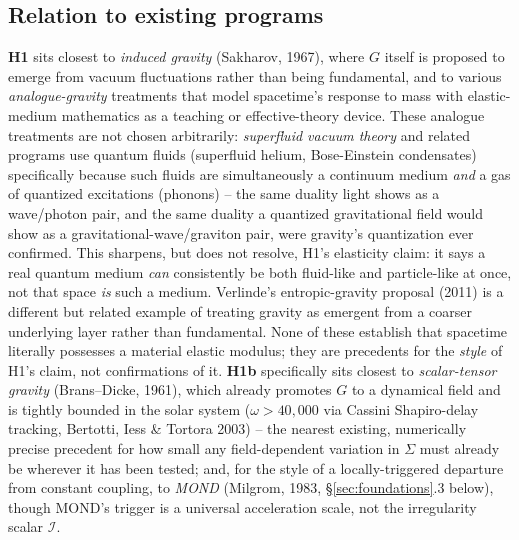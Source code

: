 \documentclass[12pt, a4paper]{article}
\begin{document}
\subsection{Relation to existing programs}
\textbf{H1} sits closest to \emph{induced gravity} (Sakharov, 1967),
where $G$ itself is proposed to emerge from vacuum fluctuations rather
than being fundamental, and to various \emph{analogue-gravity}
treatments that model spacetime's response to mass with
elastic-medium mathematics as a teaching or effective-theory device.
These analogue treatments are not chosen arbitrarily: \emph{superfluid
vacuum theory} and related programs use quantum fluids (superfluid
helium, Bose-Einstein condensates) specifically because such fluids
are simultaneously a continuum medium \emph{and} a gas of quantized
excitations (phonons) -- the same duality light shows as a
wave/photon pair, and the same duality a quantized gravitational field
would show as a gravitational-wave/graviton pair, were gravity's
quantization ever confirmed. This sharpens, but does not resolve,
H1's elasticity claim: it says a real quantum medium \emph{can}
consistently be both fluid-like and particle-like at once, not that
space \emph{is} such a medium.
Verlinde's entropic-gravity proposal (2011) is a different but related
example of treating gravity as emergent from a coarser underlying
layer rather than fundamental. None of these establish that spacetime
literally possesses a material elastic modulus; they are precedents
for the \emph{style} of H1's claim, not confirmations of it.
\textbf{H1b} specifically sits closest to \emph{scalar-tensor gravity}
(Brans--Dicke, 1961), which already promotes $G$ to a dynamical field
and is tightly bounded in the solar system ($\omega>40{,}000$ via
Cassini Shapiro-delay tracking, Bertotti, Iess \& Tortora 2003) --
the nearest existing, numerically precise precedent for how small any
field-dependent variation in $\Sigma$ must already be wherever it has
been tested; and, for the style of a locally-triggered departure from
constant coupling, to \emph{MOND} (Milgrom, 1983, \S\ref{sec:foundations}.3
below), though MOND's trigger is a universal acceleration scale, not
the irregularity scalar $\mathcal{I}$.
\end{document}
